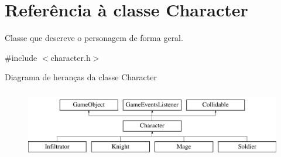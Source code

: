 \hypertarget{classCharacter}{}\section{Referência à classe Character}
\label{classCharacter}


Classe que descreve o personagem de forma geral.  




{\ttfamily \#include $<$character.\+h$>$}

Diagrama de heranças da classe Character\begin{figure}[H]
\begin{center}
\leavevmode
\includegraphics[height=3.000000cm]{classCharacter}
\end{center}
\end{figure}
